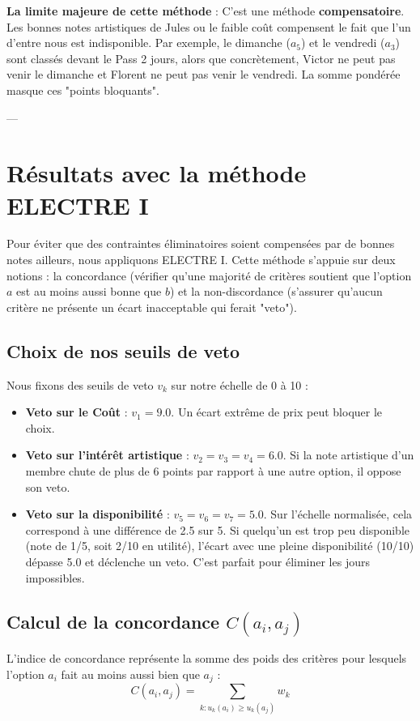 \documentclass[11pt,a4paper]{article}
\begin{document}
\textbf{La limite majeure de cette méthode} : C'est une méthode \textbf{compensatoire}. Les bonnes notes artistiques de Jules ou le faible coût compensent le fait que l'un d'entre nous est indisponible. Par exemple, le dimanche ($a_5$) et le vendredi ($a_3$) sont classés devant le Pass 2 jours, alors que concrètement, Victor ne peut pas venir le dimanche et Florent ne peut pas venir le vendredi. La somme pondérée masque ces "points bloquants".

---

\section{Résultats avec la méthode ELECTRE I}
\label{sec:electre}

Pour éviter que des contraintes éliminatoires soient compensées par de bonnes notes ailleurs, nous appliquons ELECTRE I. Cette méthode s'appuie sur deux notions : la concordance (vérifier qu'une majorité de critères soutient que l'option $a$ est au moins aussi bonne que $b$) et la non-discordance (s'assurer qu'aucun critère ne présente un écart inacceptable qui ferait "veto").

\subsection{Choix de nos seuils de veto}
Nous fixons des seuils de veto $v_k$ sur notre échelle de 0 à 10 :
\begin{itemize}
    \item \textbf{Veto sur le Coût} : $v_1 = 9.0$. Un écart extrême de prix peut bloquer le choix.
    \item \textbf{Veto sur l'intérêt artistique} : $v_2 = v_3 = v_4 = 6.0$. Si la note artistique d'un membre chute de plus de 6 points par rapport à une autre option, il oppose son veto.
    \item \textbf{Veto sur la disponibilité} : $v_5 = v_6 = v_7 = 5.0$. Sur l'échelle normalisée, cela correspond à une différence de 2.5 sur 5. Si quelqu'un est trop peu disponible (note de 1/5, soit 2/10 en utilité), l'écart avec une pleine disponibilité (10/10) dépasse 5.0 et déclenche un veto. C'est parfait pour éliminer les jours impossibles.
\end{itemize}

\subsection{Calcul de la concordance $C(a_i, a_j)$}
L'indice de concordance représente la somme des poids des critères pour lesquels l'option $a_i$ fait au moins aussi bien que $a_j$ :
$$C(a_i, a_j) = \sum_{k: u_k(a_i) \ge u_k(a_j)} w_k$$
\end{document}
